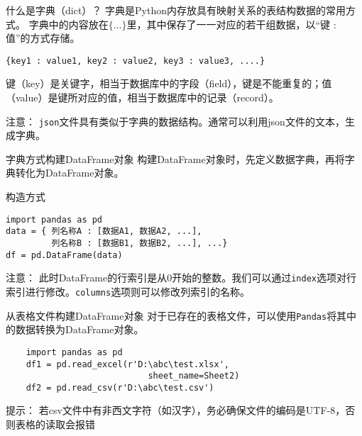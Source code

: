 \documentclass[t]{beamer}
\begin{document}
\begin{frame}[fragile]{什么是字典（dict）？}
    字典是Python内存放具有映射关系的表结构数据的常用方式。
字典中的内容放在$\{\ldots\}$里，其中保存了一一对应的若干组数据，以“键 : 值”的方式存储。

\begin{lstlisting}
{key1 : value1, key2 : value2, key3 : value3, ....}
\end{lstlisting}


键（key）是关键字，相当于数据库中的字段（field），{\color{red}键是不能重复的}；值（value）是键所对应的值，相当于数据库中的记录（record）。

\begin{block}{注意：}
    \texttt{json}文件具有类似于字典的数据结构。通常可以利用json文件的文本，生成字典。
\end{block}

\end{frame}


\begin{frame}[fragile]{字典方式构建DataFrame对象}
    构建DataFrame对象时，先定义数据字典，再将字典转化为DataFrame对象。

\begin{block}{构造方式}
   \begin{lstlisting}
import pandas as pd
data = { 列名称A : [数据A1, 数据A2, ...],
         列名称B : [数据B1, 数据B2, ...], ...}
df = pd.DataFrame(data)
\end{lstlisting} 
\end{block}    

\begin{block}{注意：}
此时DataFrame的{\color{red}行索引}是从0开始的整数。我们可以通过\texttt{\color{red}index}选项对行索引进行修改。\texttt{\color{blue}columns}选项则可以修改{\color{blue}列索引}的名称。
\end{block}
\end{frame}


\begin{frame}[fragile]{从表格文件构建DataFrame对象}
对于已存在的表格文件，可以使用\verb|Pandas|将其中的数据转换为DataFrame对象。

\begin{lstlisting}
    import pandas as pd
    df1 = pd.read_excel(r'D:\abc\test.xlsx', 
                            sheet_name=Sheet2)
    df2 = pd.read_csv(r'D:\abc\test.csv')
\end{lstlisting}
\begin{block}{提示：}
若csv文件中有非西文字符（如汉字），务必确保文件的编码是{\color{red}UTF-8}，否则表格的读取会报错
\end{block}
\end{frame}
\end{document}
